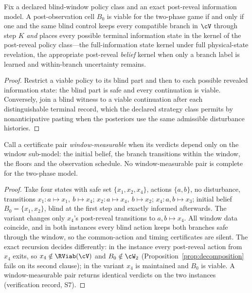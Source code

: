 \begin{proposition}\label{prop:decomposition}
Fix a declared blind-window policy class and an exact post-reveal information model. A post-observation cell $B_0$ is viable for the two-phase game if and only if one and the same blind control keeps every compatible branch in $\cV$ through step $K$ \emph{and} places every possible terminal information state in the kernel of the post-reveal policy class---the full-information state kernel under full physical-state revelation, the appropriate post-reveal \emph{belief} kernel when only a branch label is learned and within-branch uncertainty remains.
\end{proposition}

\begin{proof}
Restrict a viable policy to its blind part and then to each possible revealed information state: the blind part is safe and every continuation is viable. Conversely, join a blind witness to a viable continuation after each distinguishable terminal record, which the declared strategy class permits by nonanticipative pasting when the posteriors use the same admissible disturbance histories.
\end{proof}

\begin{proposition}\label{prop:window-nogo}
Call a certificate pair \emph{window-measurable} when its verdicts depend only on the window sub-model: the initial belief, the branch transitions within the window, the floors and the observation schedule. No window-measurable pair is complete for the two-phase model.
\end{proposition}

\begin{proof}
Take four states with safe set $\{x_1,x_2,x_4\}$, actions $\{a,b\}$, no disturbance, transitions $x_1\colon a\mapsto x_1,\ b\mapsto x_4$; $x_2\colon a\mapsto x_4,\ b\mapsto x_2$; $x_4\colon a,b\mapsto x_3$; initial belief $B_0=\{x_1,x_2\}$, blind at the first step and exactly informed afterwards. The variant changes only $x_4$'s post-reveal transitions to $a,b\mapsto x_4$. All window data coincide, and in both instances every blind action keeps both branches safe through the window, so the common-action and timing certificates are silent. The exact recursion decides differently: in the instance every post-reveal action from $x_4$ exits, so $x_4\notin\RViab(\cV)$ and $B_0\notin\cW_2$ (Proposition~\ref{prop:decomposition} fails on its second clause); in the variant $x_4$ is maintained and $B_0$ is viable. A window-measurable pair returns identical verdicts on the two instances (verification record, S7).
\end{proof}

